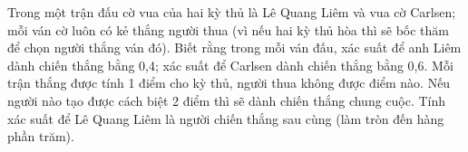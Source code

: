 \begin{ex}%
Trong một trận đấu cờ vua của hai kỳ thủ là Lê Quang Liêm và vua cờ Carlsen; mỗi ván cờ luôn có kẻ thắng người thua (vì nếu hai kỳ thủ hòa thì sẽ bốc thăm để chọn người thắng ván đó). Biết rằng trong mỗi ván đấu, xác suất để anh Liêm dành chiến thắng bằng 0,4; xác suất để Carlsen dành chiến thắng bằng 0,6. Mỗi trận thắng được tính 1 điểm cho kỳ thủ, người thua không được điểm nào. Nếu người nào tạo được cách biệt 2 điểm thì sẽ dành chiến thắng chung cuộc. Tính xác suất để Lê Quang Liêm là người chiến thắng sau cùng (làm tròn đến hàng phần trăm).
\end{ex}
